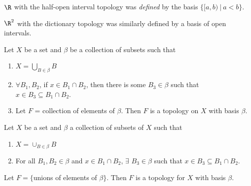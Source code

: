 \begin{example}
$\R$ with the half-open interval topology was {\it defined} by the basis $\big\{ [a, b)\ |\ a < b\big\}$.
\end{example}

\begin{example}
$\R^2$ with the dictionary topology was similarly defined by a basis of open intervals.
\end{example}

\begin{theorem}
Let $X$ be a set and $\beta$ be a collection of subsets such that
\begin{enumerate}
\item $X = \bigcup_{B\in \beta} B$
\item $\forall B_1, B_2$, if $x\in B_1\cap B_2$, then there is some $B_3\in\beta$ such that $x\in B_3\subseteq B_1\cap B_2$.
\item Let $F$ = collection of elements of $\beta$.  Then $F$ is a topology on $X$ with basis $\beta$.
\end{enumerate}
\end{theorem}

\begin{theorem}
Let $X$ be a set and $\beta$ a collection of subsets of $X$ such that
\begin{enumerate}
	\item $X = \cup_{B \in \beta} B$
	\item For all $B_1, B_2 \in \beta$ and $x \in B_1 \cap B_2$, $\exists$ $B_3 \in \beta$ such that $x \in B_3 \subseteq B_1 \cap B_2$.
\end{enumerate}
Let $F = \{$unions of elements of $\beta \}$. Then $F$ is a topology for $X$ with basis $\beta$. 
\end{theorem}

